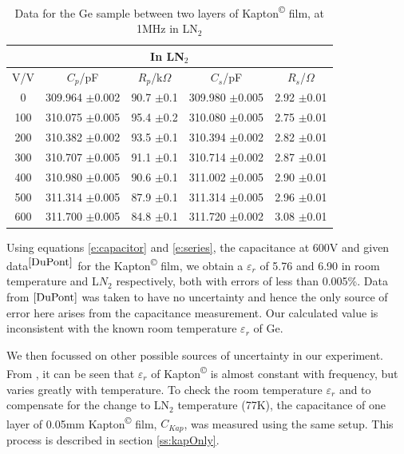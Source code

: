 \documentclass[a4paper,11pt]{article}
\begin{document}
\begin{table}[htbp]
\label{t:KapGeLN2}
\begin{center}
	\caption{Data for the Ge sample between two layers of Kapton\textsuperscript{\copyright} film, at 1MHz in LN$_{2}$}
\begin{tabular}{| c | c | c | c | c |}
	\hline
	\multicolumn{5}{|c|}{In LN$_{2}$}\\
	\hline
		V/V & $C_{p}$/pF & $R_{p}$/k$\Omega$ & $C_{s}$/pF & $R_{s}$/$\Omega$\\ \hline
		
		0 & 309.964 $\pm$0.002 & 90.7 $\pm$0.1 & 309.980 $\pm$0.005 & 2.92 $\pm$0.01\\ \hline
		100 & 310.075 $\pm$0.005 & 95.4 $\pm$0.2 & 310.080 $\pm$0.005 & 2.75 $\pm$0.01\\ \hline
		200 & 310.382 $\pm$0.002 & 93.5 $\pm$0.1 & 310.394 $\pm$0.002 & 2.82 $\pm$0.01\\ \hline
		300 & 310.707 $\pm$0.005 & 91.1 $\pm$0.1 & 310.714 $\pm$0.002 & 2.87 $\pm$0.01\\ \hline
		400 & 310.980 $\pm$0.005 & 90.6 $\pm$0.1 & 311.002 $\pm$0.005 & 2.90 $\pm$0.01\\ \hline
		500 & 311.314 $\pm$0.005 & 87.9 $\pm$0.1 & 311.314 $\pm$0.005 & 2.96 $\pm$0.01\\ \hline
		600 & 311.700 $\pm$0.005 & 84.8 $\pm$0.1 & 311.720 $\pm$0.002 & 3.08 $\pm$0.01 \\
	\hline
\end{tabular}
\end{center}	
\end{table}

Using equations \ref{e:capacitor} and \ref{e:series}, the capacitance at 600V and given data$^{\cite{DuPont}}$ for the Kapton\textsuperscript{\copyright} film, we obtain a  $\varepsilon_{r}$ of 5.76 and 6.90 in room temperature and L$N_{2}$ respectively, both with errors of less than 0.005\%. Data from $\cite{DuPont}$ was taken to have no uncertainty and hence the only source of error here arises from the capacitance measurement. Our calculated value is inconsistent with the known room temperature $\varepsilon_{r}$ of Ge. 

We then focussed on other possible sources of uncertainty in our experiment. From \cite{DuPont}, it can be seen that $\varepsilon_{r}$ of Kapton\textsuperscript{\copyright} is almost constant with frequency, but varies greatly with temperature. To check the room temperature $\varepsilon_{r}$ and to compensate for the change to LN$_{2}$ temperature (77K), the capacitance of one layer of 0.05mm Kapton\textsuperscript{\copyright} film, $C_{Kap}$, was measured using the same setup. This process is described in section \ref{ss:kapOnly}.
\end{document}
